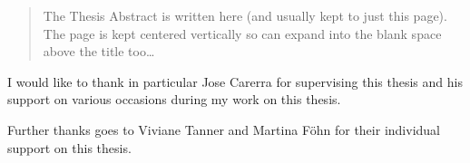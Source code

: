 \documentclass[
11pt, %
english, %
singlespacing, %
headsepline, %
]{MastersDoctoralThesis} %
\begin{document}




\begin{abstract}
\addchaptertocentry{\abstractname} %

The Thesis Abstract is written here (and usually kept to just this page). The page is kept centered vertically so can expand into the blank space above the title too\ldots

\end{abstract}


\begin{acknowledgements}
\addchaptertocentry{\acknowledgementname} %

\noindent I would like to thank in particular Jose Carerra for supervising this thesis and his support on various occasions during my work on this thesis.

Further thanks goes to Viviane Tanner and Martina Föhn for their individual support on this thesis.

\end{acknowledgements}


\tableofcontents %

\listoffigures %

\listoftables %

\end{document}
